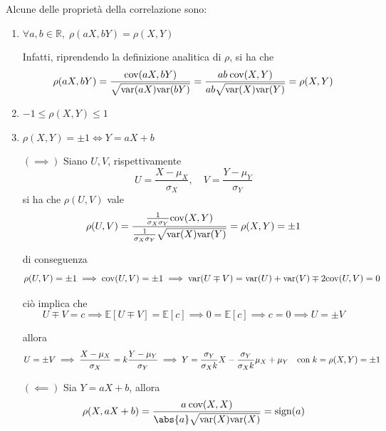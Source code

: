             Alcune delle proprietà della correlazione sono:
            \begin{enumerate}
                \item $\forall a, b \in \mathbb{R}, \; \rho(aX, bY) = \rho(X, Y)$

                Infatti, riprendendo la definizione analitica di $\rho$, si ha che
                \[
                    \rho(aX, bY) = \frac{\textnormal{cov}(aX, bY)}{\sqrt{\textnormal{var}(aX)\textnormal{var}(bY)}} = \frac{ab \: \textnormal{cov}(X, Y)}{ab \sqrt{\textnormal{var}(X)\textnormal{var}(Y)}} = \rho(X, Y)
                \]

                \item $-1 \leq \rho(X, Y) \leq 1$

                \item $\rho(X, Y) = \pm 1 \iff Y = a X + b$

                $(\implies)$ Siano $U, V$, rispettivamente
                \[
                    U = \frac{X - \mu_{X}}{\sigma_{X}}, \quad V = \frac{Y - \mu_{Y}}{\sigma_{Y}}
                \]
                si ha che $\rho(U, V)$ vale
                \[
                    \rho(U, V) = \frac{\frac{1}{\sigma_{X}\sigma_{Y}} \textnormal{cov}(X, Y)}{\frac{1}{\sigma_{X}\sigma_{Y}} \sqrt{\textnormal{var}(X)\textnormal{var}(Y)}} = \rho(X, Y) = \pm 1
                \]

                di conseguenza
                \[
                    \rho(U, V) = \pm 1 \implies
                    \textnormal{cov}(U, V) = \pm 1 \implies
                    \textnormal{var}(U \mp V) = \textnormal{var}(U) + \textnormal{var}(V) \mp 2 \textnormal{cov}(U, V) = 0
                \]

                ciò implica che
                \[
                    U \mp V = c \implies
                    \mathbb{E}[U \mp V] = \mathbb{E}[c]
                    \implies 0 = \mathbb{E}[c] \implies
                    c = 0 \implies
                    U = \pm V
                \]

                allora
                \[
                    U = \pm V \implies
                    \frac{X - \mu_{X}}{\sigma_{X}} = k \frac{Y - \mu_{Y}}{\sigma_{Y}} \implies
                    Y = \frac{\sigma_{Y}}{\sigma_{X} k} X - \frac{\sigma_{Y}}{\sigma_{X} k} \mu_{X} + \mu_{Y} \quad \textnormal{con} \; k = \rho(X, Y) = \pm 1
                \]

                $(\impliedby)$ Sia $Y = aX + b$, allora
                \[
                    \rho(X, aX + b) = \frac{a \: \textnormal{cov}(X, X)}{\abs{a} \sqrt{\textnormal{var}(X) \textnormal{var}(X)}} = \textnormal{sign}(a)
                \]
            \end{enumerate}

